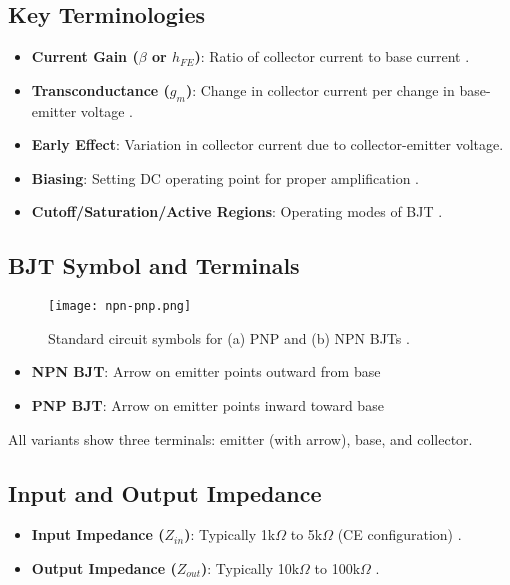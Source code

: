 \documentclass[conference]{IEEEtran}
\begin{document}
\subsection{Key Terminologies}
\begin{itemize}
    \item \textbf{Current Gain ($\beta$ or $h_{FE}$)}: Ratio of collector current to base current \cite{b1}.
    \item \textbf{Transconductance ($g_m$)}: Change in collector current per change in base-emitter voltage \cite{b2}.
    \item \textbf{Early Effect}: Variation in collector current due to collector-emitter voltage.
    \item \textbf{Biasing}: Setting DC operating point for proper amplification \cite{b1}.
    \item \textbf{Cutoff/Saturation/Active Regions}: Operating modes of BJT \cite{b2}.
\end{itemize}


\subsection{BJT Symbol and Terminals}
\begin{figure}[htbp]
\centering
\texttt{[image: npn-pnp.png]}
\caption{Standard circuit symbols for (a) PNP and (b) NPN BJTs \cite{b1}.}
\label{fig:symbols}
\end{figure}

\begin{itemize}
    \item \textbf{NPN BJT}: Arrow on emitter points outward from base
    \item \textbf{PNP BJT}: Arrow on emitter points inward toward base \cite{b2}
\end{itemize}
All variants show three terminals: emitter (with arrow), base, and collector.

\subsection{Input and Output Impedance}
\begin{itemize}
    \item \textbf{Input Impedance ($Z_{in}$)}: Typically 1k$\Omega$ to 5k$\Omega$ (CE configuration) \cite{b1}.
    \item \textbf{Output Impedance ($Z_{out}$)}: Typically 10k$\Omega$ to 100k$\Omega$ \cite{b2}.
\end{itemize}
\end{document}
